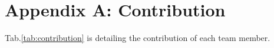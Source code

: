 \section*{Appendix A: Contribution}
Tab.\ref{tab:contribution} is detailing the contribution of each team member.

\begin{table}[!h]
  \centering
  
\end{table}